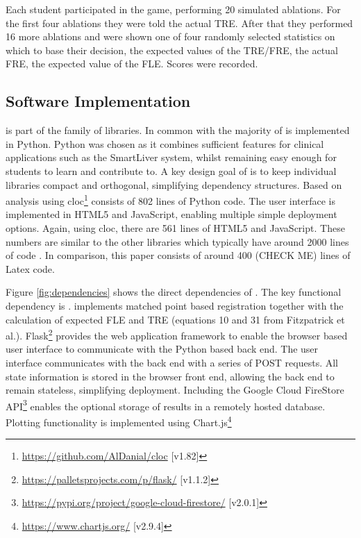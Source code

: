 Each student participated in the game, performing 20 simulated ablations. For the first four ablations they were told the 
actual \gls{TRE}. After that they performed 16 more ablations and were shown one of four randomly selected statistics on which to base their decision,
the expected values of the TRE/FRE, the actual FRE, the expected value of the FLE. Scores were recorded.

\subsection{Software Implementation}
\fred is part of the \sksurgery\cite{PMID:32436132} family of libraries. In common with \sksurgery the majority of \fred is implemented in Python. Python was chosen as it combines sufficient features for clinical
applications such as the SmartLiver system\cite{PMID:32780240}, whilst remaining easy enough for students to learn and contribute to. A key design goal of 
\sksurgery is to keep individual libraries compact and orthogonal\cite{pragmaticprog}, simplifying dependency structures. Based on 
analysis using cloc\footnote{\href{https://github.com/AlDanial/cloc}{https://github.com/AlDanial/cloc} [v1.82]} \fred consists of 802 lines of Python 
code. The user interface is implemented in HTML5 and JavaScript, enabling multiple simple deployment 
options. Again, using cloc, there are 561 lines of HTML5 and JavaScript. These numbers are similar to the other \sksurgery libraries which typically have around 2000 lines of code \cite{PMID:32436132}. In comparison, this paper consists of around 400 (CHECK ME) lines of Latex code.

Figure \ref{fig:dependencies} shows the direct dependencies of \fred. The key functional dependency is
\core\cite{matt_clarkson_2020_3965731}. \core implements matched point based registration \cite{Arun1987} together 
with the calculation of expected \gls{FLE} and \gls{TRE} (equations 10 and 31 from Fitzpatrick et al.\cite{Fitzpatrick1998}). Flask\footnote{\href{https://palletsprojects.com/p/flask/}{https://palletsprojects.com/p/flask/}  [v1.1.2]} provides the web application framework 
to enable the browser based user interface to communicate with the Python based back end. The user
interface communicates with the back end with a series of {POST} requests. All state information is stored in the 
browser front end, allowing the back end to remain stateless, simplifying deployment. 
Including the Google Cloud FireStore API\footnote{\href{https://pypi.org/project/google-cloud-firestore/}{https://pypi.org/project/google-cloud-firestore/} [v2.0.1]} 
enables the optional storage of results in a remotely hosted database. Plotting functionality is implemented
using Chart.js\footnote{\href{https://www.chartjs.org/}{https://www.chartjs.org/} [v2.9.4]}

